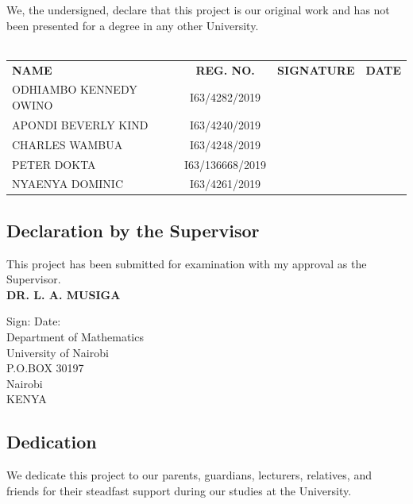 \documentclass[12pt]{article}\usepackage[]{graphicx}\usepackage[]{xcolor}
\numberwithin{equation}{section}
\numberwithin{figure}{section}
\begin{document}
	\noindent We, the undersigned, declare that this project is our original work and has not been presented for a degree in any other University.\\\\
	
	\begin{tabular}{l c r r}
		\vspace{0.5cm}
		\noindent
		\textbf{NAME} & \textbf{REG. NO.} & \textbf{SIGNATURE} & \textbf{DATE}\\
		\vspace{0.5cm}
		ODHIAMBO KENNEDY OWINO & I63/4282/2019 & \dotfill & \dotfill \\
		\vspace{0.5cm}
		APONDI BEVERLY KIND & I63/4240/2019 & \dotfill & \dotfill \\
		\vspace{0.5cm}
		CHARLES WAMBUA & I63/4248/2019 & \dotfill & \dotfill \\
		\vspace{0.5cm}
		PETER DOKTA & I63/136668/2019 & \dotfill & \dotfill \\
		\vspace{0.5cm}
		NYAENYA DOMINIC & I63/4261/2019 & \dotfill & \dotfill \\
	\end{tabular}
	\subsection*{Declaration by the Supervisor}
	\noindent This project has been submitted for examination with my approval as the Supervisor.\\
	
	\vspace{0.5cm}
	\noindent \textbf{DR. L. A. MUSIGA}\\
	
	\vspace{0.3cm}
	
	\noindent Sign: \dotfill Date: \dotfill \\
	
	\noindent Department of Mathematics\\
	University of Nairobi\\
	P.O.BOX 30197\\
	Nairobi\\
	KENYA
	
	\newpage
	
	\subsection*{Dedication}
	We dedicate this project to our parents, guardians, lecturers, relatives, and friends for their steadfast support during our studies at the University.
	
\end{document}
